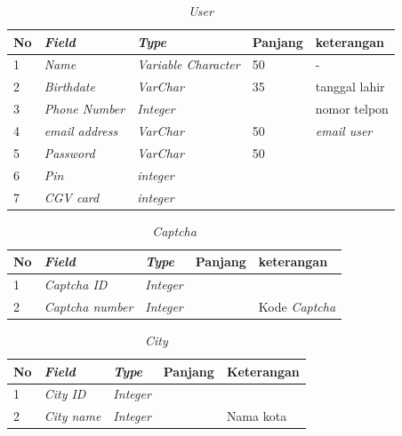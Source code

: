 \begin{table}[!htbp]
\captionsetup{singlelinecheck=off}
\caption{\textit{User}}
\label{kamusdata}
\begin{tabular}{|l|l|l|l|l|}
\hline
No & \textit{Field} & \textit{Type} & Panjang & keterangan \\
\hline

1 &  \textit{Name} & \textit{Variable Character}  & 50 & -  \\

\hline

2 &  \textit{Birthdate} & \textit{VarChar}  & 35 & tanggal lahir \\
\hline

3 &  \textit{Phone Number} & \textit{Integer} &  & nomor telpon  \\
\hline

4 &  \textit{email address} & \textit{VarChar} & 50 & \textit{email user}  \\    
\hline

5 & \textit{Password} & \textit{VarChar} & 50 &  \\
\hline

6 & \textit{Pin} & \textit{integer} &  & \\
\hline

7 & \textit{CGV card} & \textit{integer} & &\\
\hline 
\end{tabular}
\end{table}


\begin{table}[!htbp]
\captionsetup{singlelinecheck=off}
\caption{\textit{Captcha}}
\label{kamusdata2}
\begin{tabular}{|l|l|l|l|l|}
\hline
No & \textit{Field} & \textit{Type} & Panjang & keterangan \\
\hline

1 &  \textit{Captcha ID} & \textit{Integer}  &  &   \\

\hline

2 &  \textit{Captcha number} & \textit{Integer}  &  & Kode \textit{Captcha} \\
\hline

\end{tabular}
\end{table}

\begin{table}[!htbp]
\captionsetup{singlelinecheck=off}
\caption{\textit{City}}
\label{kamusdata3}
\begin{tabular}{|l|l|l|l|l|}
\hline
No & \textit{Field} & \textit{Type} & Panjang & Keterangan \\
\hline

1 &  \textit{City ID} & \textit{Integer}  &  &   \\

\hline

2 &  \textit{City name} & \textit{Integer}  &  & Nama kota \\
\hline

\end{tabular}
\end{table}


